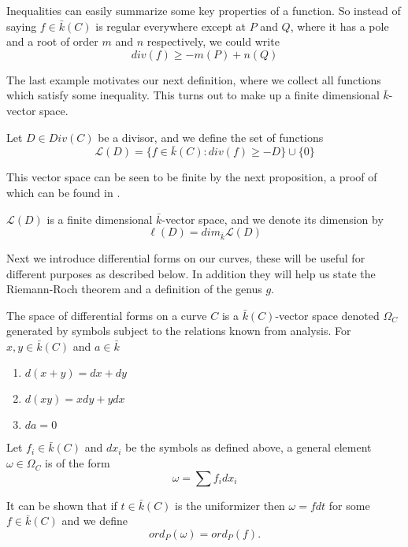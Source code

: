 \begin{ex}
 Inequalities can easily summarize some key properties of a function. So instead of
saying $f \in \bar{k}(C)$ is regular everywhere except at $P$ and $Q$, where it has a
pole and a root of order $m$ and $n$ respectively, we could write
$$ div(f) \geq -m(P)+n(Q) $$
\end{ex}



The last example motivates our next definition, where we collect all functions
which satisfy some inequality. This turns out to make up a finite dimensional
$\bar{k}$-vector space.

\begin{mydef}
 Let $D \in Div(C)$ be a divisor, and we define the set of functions
$$ \mathscr{L}(D) = \{ f\in \bar{k}(C) : div(f) \geq -D \} \cup \{ 0\} $$
\end{mydef}

This vector space can be seen to be finite by the next proposition, a proof of
which can be found in \cite{Fulton}.

\begin{prop}
 $\mathscr{L}(D)$ is a finite dimensional $\bar{k}$-vector space, and we denote
its dimension by
$$ \ell(D) = dim_{\bar{k}} \mathscr{L}(D) $$
\end{prop}

Next we introduce differential forms on our curves, these will be useful for different purposes
as described below. In addition they will help us state the Riemann-Roch theorem and a definition
of the genus $g$.

\begin{mydef}
 The space of differential forms on a curve $C$ is a $\bar{k}(C)$-vector space denoted $\Omega_C$
generated by symbols subject to the relations known from analysis. 
For $x, y \in \bar{k}(C)$ and $a \in \bar{k}$
\begin{enumerate}
  \item $d(x+y) = dx + dy$
  \item $d(xy) = xdy + ydx$
  \item $da = 0$
\end{enumerate}
Let $f_i \in \bar{k}(C)$ and $dx_i$ be the symbols as defined above, a general
element $\omega \in \Omega_C$ is of the form
$$ \omega = \sum f_i dx_i $$
\end{mydef}

It can be shown that if $t\in \bar{k}(C)$ is the uniformizer \cite{Fulton} then
$\omega = f dt$ for some $f\in \bar{k}(C)$ and we define
$$ord_P(\omega) = ord_P(f).$$

